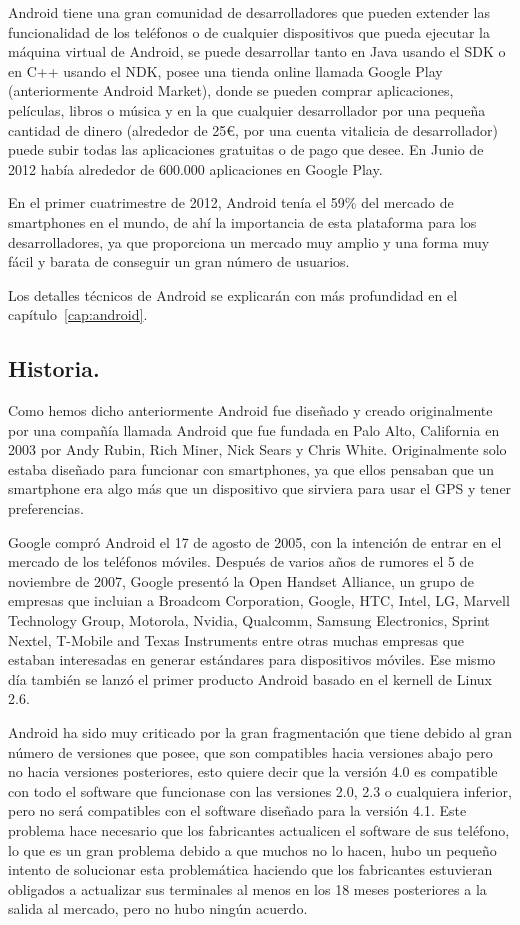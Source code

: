 Android tiene una gran comunidad de desarrolladores que pueden extender las funcionalidad de los teléfonos o de cualquier dispositivos que pueda ejecutar la máquina virtual de Android, se puede desarrollar tanto en Java usando el SDK o en C++ usando el NDK, posee una tienda online llamada Google Play (anteriormente Android Market), donde se pueden comprar aplicaciones, películas, libros o música y en la que cualquier desarrollador por una pequeña cantidad de dinero (alrededor de 25\euro, por una cuenta vitalicia de desarrollador) puede subir todas las aplicaciones gratuitas o de pago que desee. En Junio de 2012 había alrededor de 600.000 aplicaciones en Google Play.

En el primer cuatrimestre de 2012, Android tenía el 59\% del mercado de smartphones en el mundo, de ahí la importancia de esta plataforma para los desarrolladores, ya que proporciona un mercado muy amplio y una forma muy fácil y barata de conseguir un gran número de usuarios.

Los detalles técnicos de Android se explicarán con más profundidad en el capítulo~\ref{cap:android}.

\subsection{Historia.}

Como hemos dicho anteriormente Android fue diseñado y creado originalmente por una compañía llamada Android que fue fundada en Palo Alto, California en 2003 por Andy Rubin, Rich Miner, Nick Sears y Chris White. Originalmente solo estaba diseñado para funcionar con smartphones, ya que ellos pensaban que un smartphone era algo más que un dispositivo que sirviera para usar el GPS y tener preferencias. 

Google compró Android el 17 de agosto de 2005, con la intención de entrar en el mercado de los teléfonos móviles. Después de varios años de rumores el 5 de noviembre de 2007, Google presentó la Open Handset Alliance, un grupo de empresas que incluian a Broadcom Corporation, Google, HTC, Intel, LG, Marvell Technology Group, Motorola, Nvidia, Qualcomm, Samsung Electronics, Sprint Nextel, T-Mobile and Texas Instruments entre otras muchas empresas que estaban interesadas en generar estándares para dispositivos móviles. Ese mismo día también se lanzó el primer producto Android basado en el kernell de Linux 2.6.

Android ha sido muy criticado por la gran fragmentación que tiene debido al gran número de versiones que posee, que son compatibles hacia versiones abajo pero no hacia versiones posteriores, esto quiere decir que la versión 4.0 es compatible con todo el software que funcionase con las versiones 2.0, 2.3 o cualquiera inferior, pero no será compatibles con el software diseñado para la versión 4.1. Este problema hace necesario que los fabricantes actualicen el software de sus teléfono, lo que es un gran problema debido a que muchos no lo hacen, hubo un pequeño intento de solucionar esta problemática haciendo que los fabricantes estuvieran obligados a actualizar sus terminales al menos en los 18 meses posteriores a la salida al mercado, pero no hubo ningún acuerdo.   

